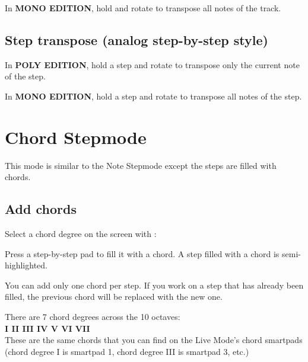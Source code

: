 In \textbf{MONO EDITION}, hold  and rotate \encodericon{} to transpose all notes of the track.


\subsection{Step transpose (analog step-by-step style)}

In \textbf{POLY EDITION}, hold a step \padsicon{} and rotate \encodericon{} to transpose only the current note of the step.


In \textbf{MONO EDITION}, hold a step \padsicon{} and rotate \encodericon{} to transpose all notes of the step.




\section{Chord Stepmode}

This mode is similar to the Note Stepmode except the steps are filled with chords.

\subsection{Add chords}

Select a chord degree on the screen with \encodericon{}:



Press a step-by-step pad \padsicon{} to fill it with a chord. A step filled with a chord is semi-highlighted.


You can add only one chord per step. If you work on a step that has already been filled, the previous chord will be replaced with the new one.

There are 7 chord degrees across the 10 octaves:\\
\textbf{I  II  III  IV  V  VI  VII}\\
These are the same chords that you can find on the Live Mode's chord smartpads (chord degree I is smartpad 1, chord degree III is smartpad 3, etc.)

